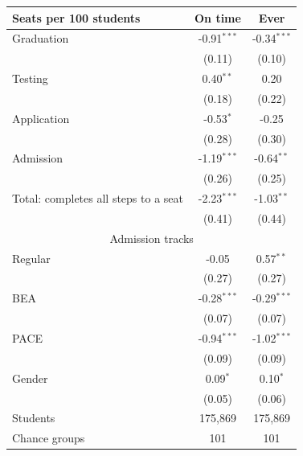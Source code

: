 \begin{tabular}{lcc}
\toprule
Seats per 100 students & On time & Ever \\
\midrule
Graduation & -0.91$^{***}$ & -0.34$^{***}$ \\
 & (0.11) & (0.10) \\
Testing & 0.40$^{**}$ & 0.20 \\
 & (0.18) & (0.22) \\
Application & -0.53$^{*}$ & -0.25 \\
 & (0.28) & (0.30) \\
Admission & -1.19$^{***}$ & -0.64$^{**}$ \\
 & (0.26) & (0.25) \\
Total: completes all steps to a seat & -2.23$^{***}$ & -1.03$^{**}$ \\
 & (0.41) & (0.44) \\
\midrule
\multicolumn{3}{c}{Admission tracks} \\
\midrule
Regular & -0.05 & 0.57$^{**}$ \\
 & (0.27) & (0.27) \\
BEA & -0.28$^{***}$ & -0.29$^{***}$ \\
 & (0.07) & (0.07) \\
PACE & -0.94$^{***}$ & -1.02$^{***}$ \\
 & (0.09) & (0.09) \\
Gender & 0.09$^{*}$ & 0.10$^{*}$ \\
 & (0.05) & (0.06) \\
\midrule
Students & 175,869 & 175,869 \\
Chance groups & 101 & 101 \\
\bottomrule
\end{tabular}
